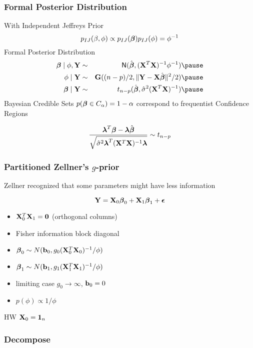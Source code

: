 \documentclass[handout]{beamer}
\begin{document}
\begin{frame}
  \frametitle{Formal Posterior Distribution}
  With Independent Jeffreys Prior
$$p_{IJ}(\beta, \phi) \propto p_{IJ}(\boldsymbol{\beta}) p_{IJ}(\phi) =  \phi^{-1}$$
\pause
Formal Posterior Distribution
\pause
\begin{eqnarray*}
  \b \mid \phi, \Y & \sim & \N(\bhat, (\X^T\X)^{-1} \phi^{-1}) \pause \\
  \phi \mid \Y & \sim& \G((n-p)/2, \| \Y - \X\bhat \|^2/2) \pause\\
\b \mid \Y & \sim & t_{n-p}(\bhat, \shat (\X^T\X)^{-1})\pause
\end{eqnarray*}
Bayesian Credible Sets
$p(\boldsymbol{\beta} \in C_\alpha) = 1- \alpha$ correspond to frequentist Confidence
Regions

$$\frac{\boldsymbol{\lambda}^T\boldsymbol{\beta} - \boldsymbol{\lambda}\hat{\boldsymbol{\beta}}}
{\sqrt{{\hat{\sigma}}^2 \boldsymbol{\lambda}^T(\mathbf{X}^T\mathbf{X})^{-1} \boldsymbol{\lambda}}} \sim t_{n-p}$$

\end{frame}



\begin{frame}
 \frametitle{Partitioned Zellner's $g$-prior }
  
Zellner recognized that some parameters might have less information

$$ \mathbf{Y} = \mathbf{X}_0 \boldsymbol{\beta}_0 + \mathbf{X}_1 \boldsymbol{\beta}_1 + \boldsymbol{\epsilon}$$

\begin{itemize}
\item $\mathbf{X}_0^T \mathbf{X}_1 = \mathbf{0}$ (orthogonal columns) \pause
\item Fisher information block diagonal \pause
\item $\boldsymbol{\beta}_0 \sim N( \mathbf{b}_0,  g_0 (\mathbf{X}_0^T\mathbf{X}_0)^{-1}/\phi)$ \pause
\item $\boldsymbol{\beta}_1 \sim N( \mathbf{b}_1,  g_1 (\mathbf{X}_1^T\mathbf{X}_1)^{-1}/\phi)$ \pause
\item limiting case $g_0 \to \infty$, $\mathbf{b}_0 = 0$ \pause
\item $p(\phi) \propto 1/\phi$ 
\end{itemize}
HW $\mathbf{X}_0 = \mathbf{1}_n$
\end{frame}


\begin{frame} \frametitle{Decompose}


\end{frame}
\end{document}
